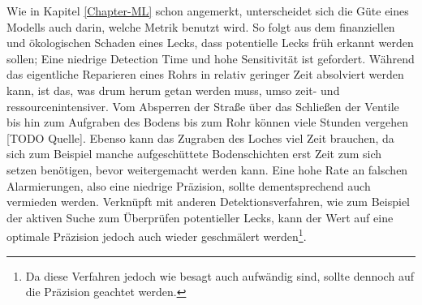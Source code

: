 Wie in Kapitel \ref{Chapter-ML} schon angemerkt, unterscheidet sich die Güte eines Modells auch darin, welche Metrik
 benutzt wird. So folgt aus dem finanziellen und ökologischen Schaden eines Lecks, dass potentielle Lecks
 früh erkannt werden sollen; Eine niedrige Detection Time und hohe Sensitivität ist gefordert.
 Während das eigentliche Reparieren eines Rohrs in relativ geringer Zeit absolviert werden kann, ist das, was
 drum herum getan werden muss, umso zeit- und ressourcenintensiver. Vom Absperren der Straße über das Schließen
 der Ventile bis hin zum Aufgraben des Bodens bis zum Rohr können viele Stunden vergehen [TODO Quelle]. Ebenso kann
 das Zugraben des Loches viel Zeit brauchen, da sich zum Beispiel manche aufgeschüttete Bodenschichten erst Zeit
 zum sich setzen benötigen, bevor weitergemacht werden kann. Eine hohe Rate an falschen Alarmierungen, also eine
 niedrige Präzision, sollte dementsprechend auch vermieden werden. Verknüpft mit anderen Detektionsverfahren,
 wie zum Beispiel der aktiven Suche zum Überprüfen potentieller Lecks, kann der Wert auf eine optimale Präzision
 jedoch auch wieder geschmälert werden\footnote{Da diese Verfahren jedoch wie besagt auch aufwändig sind, sollte
 dennoch auf die Präzision geachtet werden.}.

